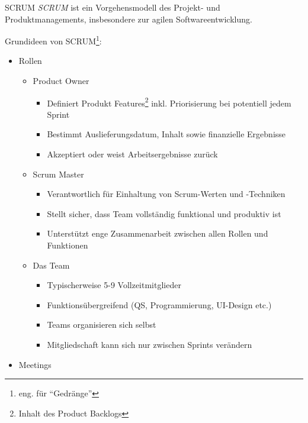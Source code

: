 \begin{defi}{SCRUM}
    \emph{SCRUM} ist ein Vorgehensmodell des Projekt- und Produktmanagements, insbesondere zur agilen Softwareentwicklung.

    Grundideen von SCRUM\footnote{eng. für \enquote{Gedränge}}:
    \begin{itemize}
        \item Rollen
              \begin{itemize}
                  \item Product Owner
                        \begin{itemize}
                            \item Definiert Produkt Features\footnote{Inhalt des Product Backlogs} inkl. Priorisierung bei potentiell jedem Sprint
                            \item Bestimmt Auslieferungsdatum, Inhalt sowie finanzielle Ergebnisse
                            \item Akzeptiert oder weist Arbeitsergebnisse zurück
                        \end{itemize}
                  \item Scrum Master
                        \begin{itemize}
                            \item Verantwortlich für Einhaltung von Scrum-Werten und -Techniken
                            \item Stellt sicher, dass Team vollständig funktional und produktiv ist
                            \item Unterstützt enge Zusammenarbeit zwischen allen Rollen und Funktionen
                        \end{itemize}
                  \item Das Team
                        \begin{itemize}
                            \item Typischerweise 5-9 Vollzeitmitglieder
                            \item Funktionsübergreifend (QS, Programmierung, UI-Design etc.)
                            \item Teams organisieren sich selbst
                            \item Mitgliedschaft kann sich nur zwischen Sprints verändern
                        \end{itemize}
              \end{itemize}
        \item Meetings

\end{itemize}
\end{defi}
